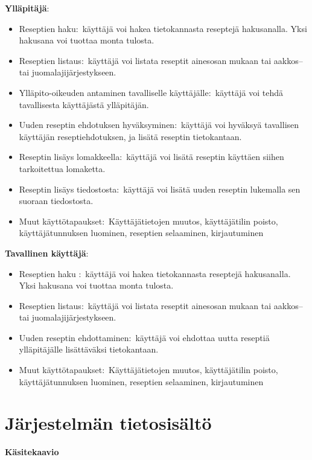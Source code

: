 \documentclass[a4paper]{article}
\begin{document}
\begin{flushleft}\textbf{Ylläpitäjä\(\colon\)} \end{flushleft}
\begin{itemize}
	\item Reseptien haku\(\colon\) käyttäjä voi hakea tietokannasta reseptejä hakusanalla. Yksi hakusana voi tuottaa monta tulosta.
	\item Reseptien listaus\(\colon\) käyttäjä voi listata reseptit ainesosan mukaan tai aakkos-- tai juomalajijärjestykseen.
	\item Ylläpito-oikeuden antaminen tavalliselle käyttäjälle\(\colon\) käyttäjä voi tehdä tavallisesta käyttäjästä ylläpitäjän. 
	\item Uuden reseptin ehdotuksen hyväksyminen\(\colon\) käyttäjä voi hyväksyä tavallisen käyttäjän reseptiehdotuksen, ja lisätä reseptin tietokantaan.
	\item Reseptin lisäys lomakkeella\(\colon\) käyttäjä voi lisätä reseptin käyttäen siihen tarkoitettua lomaketta.
	\item Reseptin lisäys tiedostosta\(\colon\) käyttäjä voi lisätä uuden reseptin lukemalla sen suoraan tiedostosta. 
	\item Muut käyttötapaukset\(\colon\) Käyttäjätietojen muutos, käyttäjätilin poisto, käyttäjätunnuksen luominen, reseptien selaaminen, kirjautuminen
\end{itemize}

\begin{flushleft}\textbf{Tavallinen käyttäjä\(\colon\)} \end{flushleft}

\begin{itemize}
	\item Reseptien haku \(\colon\) käyttäjä voi hakea tietokannasta reseptejä hakusanalla. Yksi hakusana voi tuottaa monta tulosta.
	\item Reseptien listaus\(\colon\) käyttäjä voi listata reseptit ainesosan mukaan tai aakkos-- tai juomalajijärjestykseen.
	\item Uuden reseptin ehdottaminen\(\colon\) käyttäjä voi ehdottaa uutta reseptiä ylläpitäjälle lisättäväksi tietokantaan.
	\item Muut käyttötapaukset\(\colon\) Käyttäjätietojen muutos, käyttäjätilin poisto, käyttäjätunnuksen luominen, reseptien selaaminen, kirjautuminen
\end{itemize}

\section{Järjestelmän tietosisältö}
\begin{flushleft}\textbf{Käsitekaavio} \end{flushleft}
\end{document}
